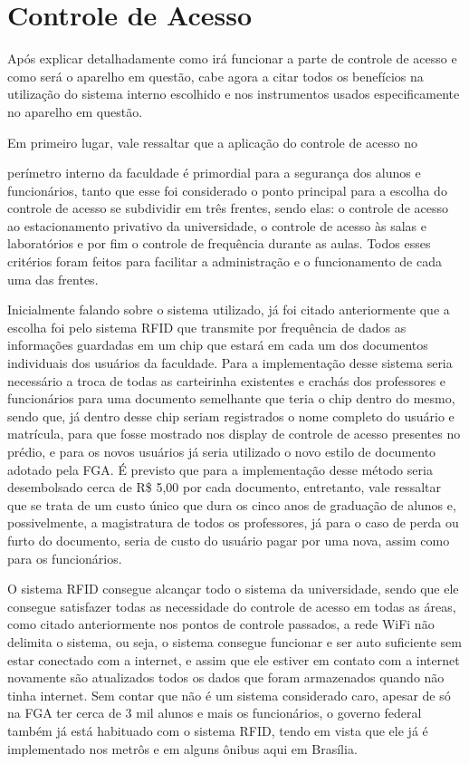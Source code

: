 \chapter[Controle de Acesso]{Controle de Acesso}

Após explicar detalhadamente como irá funcionar a parte de controle de acesso e
como será o aparelho em questão, cabe agora a citar todos os benefícios na
utilização do sistema interno escolhido e nos instrumentos usados
especificamente no aparelho em questão.

Em primeiro lugar, vale ressaltar que a aplicação do controle de acesso no

perímetro interno da faculdade é primordial para a segurança dos alunos e
funcionários, tanto que esse foi considerado o ponto principal para a escolha do
controle de acesso se subdividir em três frentes, sendo elas: o controle de
acesso ao estacionamento privativo da universidade, o controle de acesso às
salas e laboratórios e por fim o controle de frequência durante as aulas. Todos
esses critérios foram feitos para facilitar a administração e o funcionamento de
cada uma das frentes.

Inicialmente falando sobre o sistema utilizado, já foi citado anteriormente que
a escolha foi pelo sistema RFID que transmite por frequência de dados as
informações guardadas em um chip que estará em cada um dos documentos
individuais dos usuários da faculdade. Para a implementação desse sistema seria
necessário a troca de todas as carteirinha existentes e crachás dos professores
e funcionários para uma documento semelhante que teria o chip dentro do mesmo,
sendo que, já dentro desse chip seriam registrados o nome completo do usuário e
matrícula, para que fosse mostrado nos display de controle de acesso presentes
no prédio, e para os novos usuários já seria utilizado o novo estilo de
documento adotado pela FGA. É previsto que para a implementação desse método
seria desembolsado cerca de R\$ 5,00 por cada documento, entretanto, vale
ressaltar que se trata de um custo único que dura os cinco anos de graduação de
alunos e, possivelmente, a magistratura de todos os professores, já para o caso
de perda ou furto do documento, seria de custo do usuário pagar por uma nova,
assim como para os funcionários.

O sistema RFID consegue alcançar todo o sistema da universidade, sendo que ele
consegue satisfazer todas as necessidade do controle de acesso em todas as
áreas, como citado anteriormente nos pontos de controle passados, a rede WiFi
não delimita o sistema, ou seja, o sistema consegue  funcionar e ser auto
suficiente  sem estar conectado com a internet, e assim que ele estiver em
contato com a internet novamente são atualizados todos os dados que foram
armazenados quando não tinha internet. Sem contar que não é um sistema
considerado caro, apesar de só na FGA ter cerca de 3 mil alunos e mais os
funcionários, o governo federal também já está habituado com o sistema RFID,
tendo em vista que ele já é implementado nos metrôs e em alguns ônibus aqui em
Brasília.

